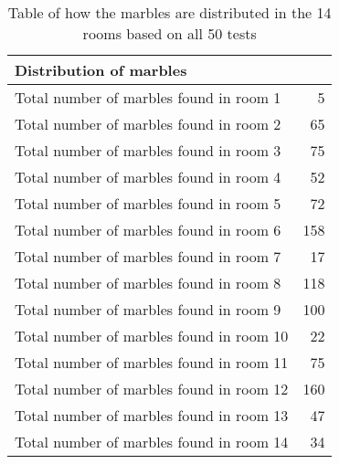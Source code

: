 \documentclass[../Head/Main.tex]{subfiles}
\begin{document}
\begin{minipage}[c]{0.45\textwidth}
	\begin{table}[H]
	\centering
	\begin{tabular}{l r}
		\hline
		\multicolumn{2}{l}{\textbf{Distribution of marbles}}  			\\ \hline
		Total number of marbles found in room 1  & 5\\
		Total number of marbles found in room 2  & 65\\
		Total number of marbles found in room 3  & 75\\
		Total number of marbles found in room 4  & 52\\
		Total number of marbles found in room 5  & 72\\
		Total number of marbles found in room 6  & 158\\
		Total number of marbles found in room 7  & 17\\
		Total number of marbles found in room 8  & 118\\
		Total number of marbles found in room 9  & 100\\
		Total number of marbles found in room 10 & 22\\
		Total number of marbles found in room 11 & 75\\
		Total number of marbles found in room 12 & 160\\
		Total number of marbles found in room 13 & 47\\
		Total number of marbles found in room 14 & 34\\					\hline
	\end{tabular}
	\caption{Table of how the marbles are distributed in the 14 rooms based on all 50 tests}
	\label{tab:probability_raw_data}
\end{table}
\end{minipage}
\hfill
\end{document}

